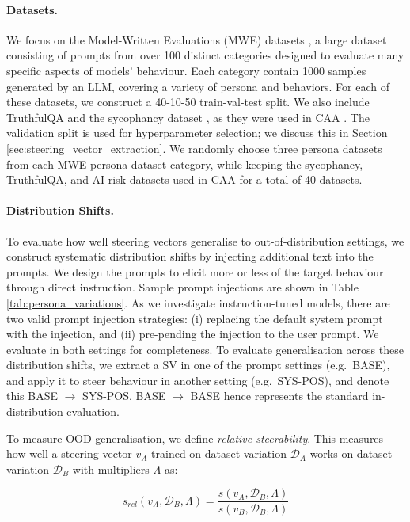 \documentclass{article}
\begin{document}
\paragraph{Datasets.} We focus on the Model-Written Evaluations (MWE) datasets \citep{perezDiscoveringLanguageModel2022a}, a large dataset consisting of prompts from over 100 distinct categories designed to evaluate many specific aspects of models' behaviour. Each category contain 1000 samples generated by an LLM, covering a variety of persona and behaviors. For each of these datasets, we construct a 40-10-50 train-val-test split. We also include TruthfulQA \citep{linTruthfulQAMeasuringHow2022} and the sycophancy dataset \citep{perezDiscoveringLanguageModel2022a}, as they were used in CAA \citep{rimskySteeringLlamaContrastive2023}. The validation split is used for hyperparameter selection; we discuss this in Section \ref{sec:steering_vector_extraction}. We randomly choose three persona datasets from each MWE persona dataset category, while keeping the sycophancy, TruthfulQA, and AI risk datasets used in CAA for a total of 40 datasets.

\paragraph{Distribution Shifts.} To evaluate how well steering vectors generalise to out-of-distribution settings, we construct systematic distribution shifts by injecting additional text into the prompts. We design the prompts to elicit more or less of the target behaviour through direct instruction. Sample prompt injections are shown in Table \ref{tab:persona_variations}. As we investigate instruction-tuned models, there are two valid prompt injection strategies: (i) replacing the default system prompt with the injection, and (ii) pre-pending the injection to the user prompt. We evaluate in both settings for completeness. To evaluate generalisation across these distribution shifts, we extract a SV in one of the prompt settings (e.g.~BASE), and apply it to steer behaviour in another setting (e.g.~SYS-POS), and denote this BASE $\rightarrow$ SYS-POS. BASE $\rightarrow$ BASE hence represents the standard in-distribution evaluation.

To measure OOD generalisation, we define \emph{relative steerability}. This measures how well a steering vector $v_A$ trained on dataset variation $\mathcal{D}_A$ works on dataset variation $\mathcal{D}_B$ with multipliers $\Lambda$ as:

\begin{equation}\label{eq:rel_steer}
    s_{rel}(v_A, \mathcal{D}_B, \Lambda) = \frac{s(v_A, \mathcal{D}_B, \Lambda)}{s(v_B, \mathcal{D}_B, \Lambda)}
\end{equation}
\end{document}
